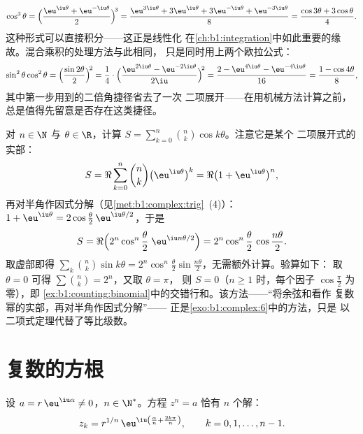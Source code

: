 \begin{example}[线性化]\label{ex:b1:complex:linearize}
\[
\cos^3\theta
= \Bigl(\frac{\eu^{\iu\theta} + \eu^{-\iu\theta}}{2}\Bigr)^{\!3}
= \frac{\eu^{3\iu\theta} + 3\eu^{\iu\theta} + 3\eu^{-\iu\theta} +
\eu^{-3\iu\theta}}{8}
= \frac{\cos 3\theta + 3\cos\theta}{4}.
\]
这种形式可以直接积分——这正是线性化
在\cref{ch:b1:integration}中如此重要的缘故。混合乘积的处理方法与此相同，
只是同时用上两个欧拉公式：
\[
\sin^2\theta\cos^2\theta
= \Bigl(\frac{\sin2\theta}2\Bigr)^{\!2}
= \frac{1}{4}\cdot
\Bigl(\frac{\eu^{2\iu\theta} - \eu^{-2\iu\theta}}{2\iu}
\Bigr)^{\!2}
= \frac{2 - \eu^{4\iu\theta} - \eu^{-4\iu\theta}}{16}
= \frac{1 - \cos4\theta}{8} ,
\]
其中第一步用到的二倍角捷径省去了一次
二项展开——在用机械方法计算之前，
总是值得先留意是否存在这类捷径。
\end{example}

\begin{example}[二项三角和]\label{ex:b1:complex:binomsum}
对 $n \in \N$ 与 $\theta \in \R$，计算 $S =
\sum_{k=0}^{n}\binom nk \cos k\theta$。注意它是某个
二项展开式的实部：
\[
S = \Re\sum_{k=0}^n \binom nk \bigl(\eu^{\iu\theta}\bigr)^k
= \Re\bigl(1 + \eu^{\iu\theta}\bigr)^n ,
\]
再对半角作因式分解（见\cref{met:b1:complex:trig}~(4)）：$1 +
\eu^{\iu\theta} = 2\cos\frac\theta2\,\eu^{\iu\theta/2}$，于是
\[
S = \Re\Bigl(2^n\cos^n\frac\theta2\;\eu^{\iu n\theta/2}\Bigr)
= 2^n \cos^n\frac\theta2\,\cos\frac{n\theta}2 .
\]
取虚部即得 $\sum_k\binom nk\sin k\theta =
2^n\cos^n\frac\theta2\sin\frac{n\theta}2$，无需额外计算。验算如下：
取 $\theta = 0$ 可得 $\sum\binom nk = 2^n$，又取 $\theta = \pi$，
则 $S = 0$（$n \geq 1$ 时，每个因子 $\cos\frac\pi2$
为零），即
\cref{ex:b1:counting:binomial}中的交错行和。该方法——“将余弦和看作
复数幂的实部，再对半角作因式分解”——
正是\cref{exo:b1:complex:6}中的方法，只是
以二项式定理代替了等比级数。
\end{example}

\section{复数的方根}

\begin{theorem}[$n$ 次方根]\label{thm:b1:complex:roots}
设 $a = r\,\eu^{\iu\alpha} \neq 0$，$n \in \N^*$。方程
$z^n = a$ 恰有 $n$ 个解：
\[
z_k = r^{1/n}\, \eu^{\iu\left(\frac{\alpha}{n} +
\frac{2k\pi}{n}\right)},
\qquad k = 0, 1, \dots, n - 1 .
\]
\end{theorem}

